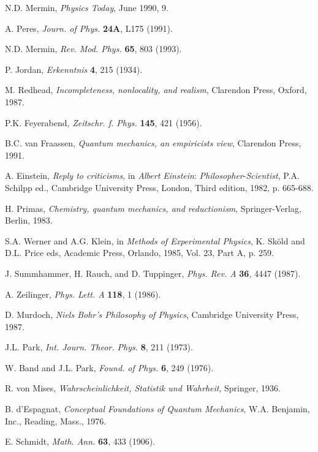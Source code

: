 \documentclass[12pt]{article}
\begin{document}
\begin{thebibliography}{10}
{N.D. Mermin, {\em Physics Today}, June 1990, 9.}

{A. Peres, {\em Journ. of Phys.} {\bf 24A}, L175 (1991).}

{N.D. Mermin, {\em Rev. Mod. Phys.} {\bf 65}, 803 (1993).}

{P. Jordan, {\em Erkenntnis} {\bf 4}, 215 (1934).}

{M. Redhead, {\em Incompleteness, nonlocality, and realism}, Clarendon Press,
  Oxford, 1987.}

{P.K. Feyerabend, {\em Zeitschr. f. Phys.} {\bf 145}, 421 (1956).}

{B.C. van Fraassen, {\em Quantum mechanics, an empiricists view}, Clarendon
  Press, 1991.}

{A. Einstein, {\em Reply to criticisms}, in {\em Albert Einstein}: {\em
  Philosopher}-{\em Scientist}, P.A. Schilpp ed., Cambridge University Press,
  London, Third edition, 1982, p. 665-688.}

{H. Primas, {\em Chemistry, quantum mechanics, and reductionism},
  Springer-Verlag, Berlin, 1983.}

{S.A. Werner and A.G. Klein, in {\em Methods of Experimental Physics}, K.
  Sk\"old and D.L. Price eds, Academic Press, Orlando, 1985, Vol. 23, Part A,
  p. 259.}

{J. Summhammer, H. Rauch, and D. Tuppinger, {\em Phys. Rev. A} {\bf 36}, 4447
  (1987).}

{A. Zeilinger, {\em Phys. Lett. A} {\bf 118}, 1 (1986).}

{D. Murdoch, {\em Niels Bohr's Philosophy of Physics}, Cambridge University
  Press, 1987.}

{J.L. Park, {\em Int. Journ. Theor. Phys.} {\bf 8}, 211 (1973).}

{W. Band and J.L. Park, {\em Found. of Phys.} {\bf 6}, 249 (1976).}

{R. von Mises, {\em Wahrscheinlichkeit, Statistik und Wahrheit}, Springer,
  1936.}

{B. d'Espagnat, {\em Conceptual Foundations of Quantum Mechanics}, W.A.
  Benjamin, Inc., Reading, Mass., 1976.}

{E. Schmidt, {\em Math. Ann.} {\bf 63}, 433 (1906).}


\end{thebibliography}
\end{document}
